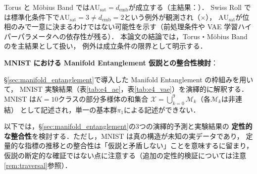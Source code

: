 \documentclass[12pt,a4paper]{jsarticle}
\newcommand{\AUsat}{\mathrm{AU}_{\mathrm{sat}}}
\newcommand{\demb}{d_{\mathrm{emb}}}
\begin{document}
Torus と Möbius Band では$\AUsat = \demb$が成立する（主結果：\checkmark）．
Swiss Roll では標準化条件下で$\AUsat = 3 \neq \demb = 2$という例外が観測され（$\times$），
$\AUsat$が位相のみで一意に決まるわけではない可能性を示す（前処理条件や
VAE 学習ハイパーパラメータへの依存性が残る）．
本論文の結論では，Torus・Möbius Band の\checkmark を主結果として扱い，
例外は成立条件の限界として明示する．

\textbf{MNIST における Manifold Entanglement 仮説との整合性検討}：

§\ref{sec:manifold_entanglement}で導入した Manifold Entanglement の枠組みを用いて，
MNIST 実験結果（表\ref{tab:e4_ae}，表\ref{tab:e4_vae}）を演繹的に解釈する．
MNIST は$K = 10$クラスの部分多様体の和集合
$\mathcal{X} = \bigcup_{k=0}^{9} \mathcal{M}_k$（各$\mathcal{M}_k$は非連結）
として記述され，単一の基本群$\pi_1$による記述ができない．

以下では，§\ref{sec:manifold_entanglement}の3つの演繹的予測と実験結果の
\textbf{定性的な整合性}を検討する．ただし，MNIST は真の構造が未知の実データであり，
定量的な指標の推移との整合性は「仮説と矛盾しない」ことを意味するに留まり，
仮説の断定的な確証ではない点に注意する（追加の定性的検証については注意\ref{rem:traversal}参照）．
\end{document}
